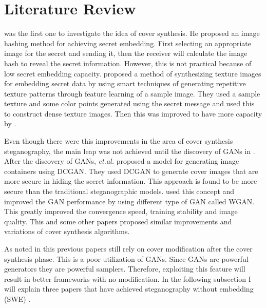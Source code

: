 \documentclass[../main/main.tex]{subfiles}
\begin{document}
	
	\section{Literature Review} \label{Literature}
	 \cite{fridrich2009steganography} was the first one to investigate the idea of cover synthesis. \cite{fridrich2009steganography} He proposed an image hashing method for achieving secret embedding. First selecting an appropriate image for the secret and sending it, then the receiver will calculate the image hash to reveal the secret information. However, this is not practical because of low secret embedding capacity. \cite{otori2007data} proposed a method of synthesizing texture images for embedding secret data by using smart techniques of generating repetitive texture patterns through feature learning of a sample image. They used a sample texture and some color points generated using the secret message and used this to construct dense texture images. Then this was improved to have more capacity by \cite{wu2014steganography}. 
	 
	 Even though there were this improvements in the area of cover synthesis steganography, the main leap was not achieved until the discovery of \gls{GAN}s in \cite{goodfellow2014generative}. After the discovery of \gls{GAN}s, \textit{et.al.} \cite{volkhonskiy2017steganographic} proposed a model for generating image containers using \gls{DCGAN}. They used \gls{DCGAN} to generate cover images that are more secure in hiding the secret information. This approach is found to be more secure than the traditional steganographic models. \cite{shi2017ssgan} used this concept and improved the \gls{GAN} performance by using different type of \gls{GAN} called \gls{WGAN}.\cite{arjovsky2017wasserstein} This greatly improved the convergence speed, training stability and image quality. This and some other papers proposed similar improvements and variations of cover synthesis algorithms.\cite{tang2017automatic}\cite{hayes2017generating}
	 
	 As noted in \cite{Zhang2019} this previous papers still rely on cover modification after the cover synthesis phase. This is a poor utilization of \gls{GAN}s. Since \gls{GAN}s are powerful generators they are powerful samplers. Therefore, exploiting this feature will result in better frameworks with no modification. In the following subsection I will explain three papers that have achieved steganography without embedding (\gls{SWE}) .\cite{Zhang2019}\cite{Hu2018}\cite{Ke}
	 
\end{document}
